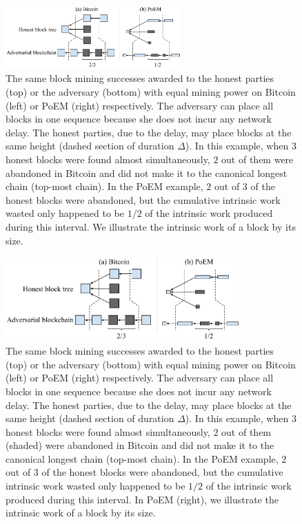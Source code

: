 \iftwocolumn
\begin{figure}
  \centering
  \includegraphics[width=0.6\textwidth,keepaspectratio]{figures/poem_work_wasted.pdf}
  \caption{The same block mining successes awarded to the honest parties (top) or the adversary (bottom)
           with equal mining power on Bitcoin (left) or PoEM (right) respectively. The adversary can place
           all blocks in one sequence because she does not incur any network delay. The honest parties,
           due to the delay, may place blocks at the same height (dashed section of duration $\Delta$).
           In this example, when $3$ honest blocks were found almost simultaneously, $2$ out of
           them were abandoned in Bitcoin and did not make it to the canonical longest chain
           (top-most chain).
           In the PoEM example, $2$ out of $3$ of the honest blocks were abandoned, but the cumulative intrinsic
           work wasted only happened to be $1/2$ of the intrinsic work produced during this interval.
           We illustrate the intrinsic work of a block by its size.}
  \label{fig:poem-wasted-work}
\end{figure}
\else
\begin{figure}
  \centering
  \includegraphics[width=0.8\textwidth,keepaspectratio]{figures/poem_work_wasted.pdf}
  \caption{The same block mining successes awarded to the honest parties (top) or the adversary (bottom)
           with equal mining power on Bitcoin (left) or PoEM (right) respectively. The adversary can place
           all blocks in one sequence because she does not incur any network delay. The honest parties,
           due to the delay, may place blocks at the same height (dashed section of duration $\Delta$).
           In this example, when $3$ honest blocks were found almost simultaneously, $2$ out of
           them (shaded) were abandoned in Bitcoin and did not make it to the canonical longest chain
           (top-most chain).
           In the PoEM example, $2$ out of $3$ of the honest blocks were abandoned, but the cumulative intrinsic
           work wasted only happened to be $1/2$ of the intrinsic work produced during this interval.
           In PoEM (right), we illustrate the intrinsic work of a block by its size.}
  \label{fig:poem-wasted-work}
\end{figure}
\fi

